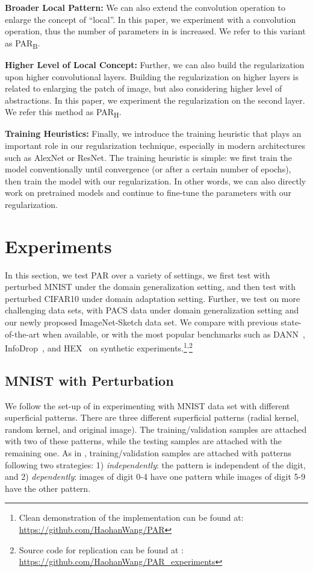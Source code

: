 \documentclass{article}
\begin{document}
\textbf{Broader Local Pattern:} 
We can also extend the  convolution operation 
to enlarge the concept of ``local''. 
In this paper, we experiment with a  convolution operation, 
thus the number of parameters in  is increased. 
We refer to this variant as PAR\textsubscript{B}.

\textbf{Higher Level of Local Concept:} 
Further, we can also build the regularization upon higher convolutional layers. 
Building the regularization on higher layers 
is related to enlarging the patch of image,
but also considering higher level of abstractions. 
In this paper, we experiment the regularization on the second layer.
We refer this method as  PAR\textsubscript{H}. 

\textbf{Training Heuristics:}
Finally, we introduce the training heuristic 
that plays an important role in our regularization technique, 
especially in modern architectures such as AlexNet or ResNet. 
The training heuristic is simple: 
we first train the model conventionally 
until convergence (or after a certain number of epochs), 
then train the model with our regularization. 
In other words, we can also directly work on pretrained models 
and continue to fine-tune the parameters with our regularization.  
\section{Experiments}
\label{sec:exp}
In this section, we test PAR over a variety of settings, we first test with perturbed MNIST under the domain generalization setting, and then test with perturbed CIFAR10 under domain adaptation setting. 
Further, we test on more challenging data sets, with PACS data under domain generalization setting and our newly proposed ImageNet-Sketch data set. 
We compare with previous state-of-the-art when available, or with the most popular benchmarks such as DANN~\citep{ganin2016domain}, InfoDrop~\citep{achille2018information}, and HEX~\citep{wang2018learning} on synthetic experiments.\footnote{Clean demonstration of the implementation can be found at: \href{https://github.com/HaohanWang/PAR}{https://github.com/HaohanWang/PAR}}\textsuperscript{,}\footnote{Source code for replication can be found at : \href{https://github.com/HaohanWang/PAR_experiments}{https://github.com/HaohanWang/PAR\_experiments}}

\subsection{MNIST with Perturbation}
We follow the set-up of 
\citet{wang2018learning} 
in experimenting with MNIST data set 
with different superficial patterns.
There are three 
different 
superficial patterns 
(radial kernel, random kernel, and original image). 
The training/validation samples 
are attached with two of these patterns, 
while the testing samples are attached with the remaining one. 
As in \citet{wang2018learning}, training/validation samples 
are attached with patterns following two strategies: 
1) \textit{independently}: the pattern is independent of the digit,
and 2) \textit{dependently}:
images of digit 0-4 have one pattern 
while images of digit 5-9 have the other pattern. 
\end{document}
